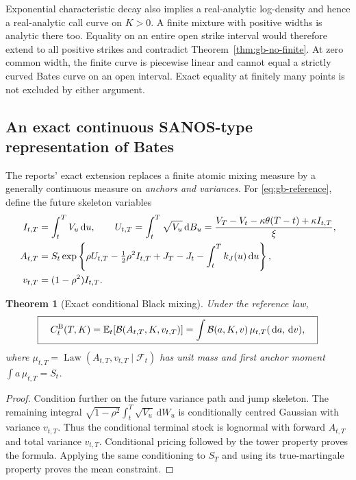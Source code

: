 \documentclass[11pt,a4paper]{article}
\numberwithin{equation}{section}
\newtheorem{theorem}{Theorem}[section]
\theoremstyle{definition}\newtheorem{definition}[theorem]{Definition}
\theoremstyle{remark}\newtheorem{remark}[theorem]{Remark}
\newcommand{\E}{\mathbb E}\newcommand{\R}{\mathbb R}
\newcommand{\F}{\mathcal F}\newcommand{\G}{\mathcal G}
\newcommand{\dd}{\,\mathrm d}\newcommand{\dt}{\,\mathrm dt}
\newcommand{\Black}{\mathcal B}\newcommand{\LC}{\mathcal L}
\begin{document}
Exponential characteristic decay also implies a real-analytic log-density and hence a real-analytic call curve on $K>0$. A finite mixture with positive widths is analytic there too. Equality on an entire open strike interval would therefore extend to all positive strikes and contradict Theorem~\ref{thm:gb-no-finite}. At zero common width, the finite curve is piecewise linear and cannot equal a strictly curved Bates curve on an open interval. Exact equality at finitely many points is not excluded by either argument.

\subsection{An exact continuous SANOS-type representation of Bates}
\label{sec:bates-mixture}
The reports' exact extension replaces a finite atomic mixing measure by a generally continuous measure on \emph{anchors and variances}. For \eqref{eq:gb-reference}, define the future skeleton variables
\begin{align}
 I_{t,T}&=\int_t^T V_u\dd u,\qquad
 U_{t,T}=\int_t^T\sqrt{V_u}\dd B_u
     =\frac{V_T-V_t-\kappa\theta(T-t)+\kappa I_{t,T}}{\xi},\notag\\
 A_{t,T}&=S_t\exp\left\{\rho U_{t,T}-\tfrac12\rho^2I_{t,T}
               +J_T-J_t-\int_t^Tk_J(u)\dd u\right\},\notag\\
 v_{t,T}&=(1-\rho^2)I_{t,T}.
 \label{eq:gb-mixture-parameters}
\end{align}

\begin{theorem}[Exact conditional Black mixing]
Under the reference law,
\begin{equation}
 \boxed{\quad C_t^{\rm B}(T,K)=\E_t[\Black(A_{t,T},K,v_{t,T})]
       =\int\Black(a,K,v)\,\mu_{t,T}(\dd a,\dd v),\quad}
 \label{eq:gb-exact-mixture}
\end{equation}
where $\mu_{t,T}=\operatorname{Law}(A_{t,T},v_{t,T}\mid\F_t)$ has unit mass and first anchor moment $\int a\,\mu_{t,T}=S_t$.
\end{theorem}
\begin{proof}
Condition further on the future variance path and jump skeleton. The remaining integral $\sqrt{1-\rho^2}\int_t^T\sqrt{V_u}\dd W_u$ is conditionally centred Gaussian with variance $v_{t,T}$. Thus the conditional terminal stock is lognormal with forward $A_{t,T}$ and total variance $v_{t,T}$. Conditional pricing followed by the tower property proves the formula. Applying the same conditioning to $S_T$ and using its true-martingale property proves the mean constraint.
\end{proof}
\end{document}
